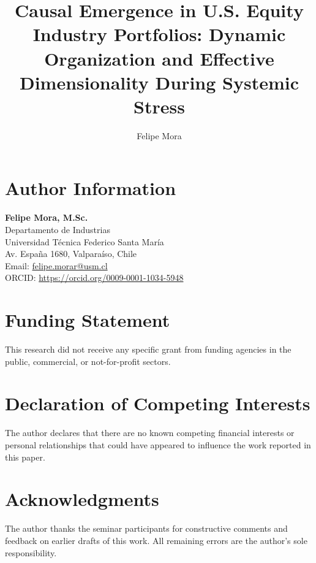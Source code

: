 \documentclass[12pt,authoryear]{elsarticle}
\begin{document}
\begin{frontmatter}

\title{Causal Emergence in U.S. Equity Industry Portfolios: Dynamic Organization and Effective Dimensionality During Systemic Stress}

\author[inst1]{Felipe Mora}


\end{frontmatter}

\section*{Author Information}
\vspace{3mm}
\noindent
\textbf{Felipe Mora, M.Sc.} \\
Departamento de Industrias \\
Universidad Técnica Federico Santa María \\
Av. España 1680, Valparaíso, Chile \\
Email: \href{mailto:felipe.morar@usm.cl}{felipe.morar@usm.cl} \\
ORCID: \href{https://orcid.org/0009-0001-1034-5948}{https://orcid.org/0009-0001-1034-5948}

\section*{Funding Statement}
This research did not receive any specific grant from funding agencies in the public, commercial, or not-for-profit sectors.

\section*{Declaration of Competing Interests}
The author declares that there are no known competing financial interests or personal relationships that could have appeared to influence the work reported in this paper.

\section*{Acknowledgments}
The author thanks the seminar participants for constructive comments and feedback on earlier drafts of this work. All remaining errors are the author's sole responsibility.
\end{document}
